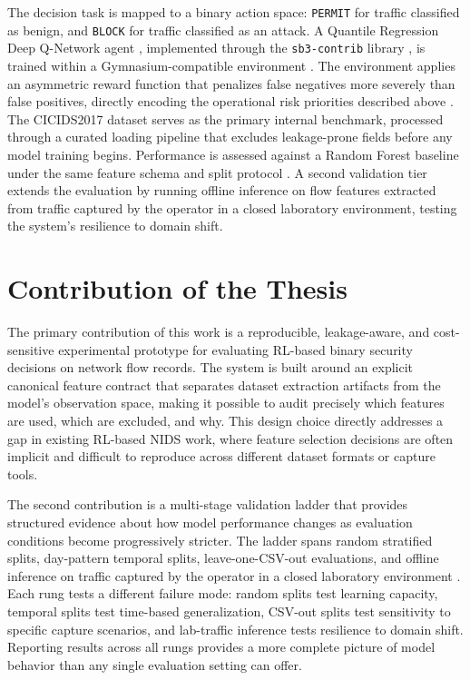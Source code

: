 The decision task is mapped to a binary action space: \texttt{PERMIT} for traffic classified as benign, and \texttt{BLOCK} for traffic classified as an attack. A Quantile Regression Deep Q-Network agent \parencite{Dabney2018QRDQN}, implemented through the \texttt{sb3-contrib} library \parencite{SB3ContribQRDQNDocs}, is trained within a Gymnasium-compatible environment \parencite{GymnasiumDocs}. The environment applies an asymmetric reward function that penalizes false negatives more severely than false positives, directly encoding the operational risk priorities described above \parencite{Cardenas2006IDSFramework}. The CICIDS2017 dataset \parencite{Sharafaldin2018CICIDS2017,CICIDS2017Web} serves as the primary internal benchmark, processed through a curated loading pipeline that excludes leakage-prone fields before any model training begins. Performance is assessed against a Random Forest baseline under the same feature schema and split protocol \parencite{Engelen2021CICIDSIssues}. A second validation tier extends the evaluation by running offline inference on flow features extracted from traffic captured by the operator in a closed laboratory environment, testing the system's resilience to domain shift.

\section{Contribution of the Thesis}
The primary contribution of this work is a reproducible, leakage-aware, and cost-sensitive experimental prototype for evaluating RL-based binary security decisions on network flow records. The system is built around an explicit canonical feature contract that separates dataset extraction artifacts from the model's observation space, making it possible to audit precisely which features are used, which are excluded, and why. This design choice directly addresses a gap in existing RL-based NIDS work, where feature selection decisions are often implicit and difficult to reproduce across different dataset formats or capture tools.

The second contribution is a multi-stage validation ladder that provides structured evidence about how model performance changes as evaluation conditions become progressively stricter. The ladder spans random stratified splits, day-pattern temporal splits, leave-one-CSV-out evaluations, and offline inference on traffic captured by the operator in a closed laboratory environment \parencite{Lanvin2023Errors}. Each rung tests a different failure mode: random splits test learning capacity, temporal splits test time-based generalization, CSV-out splits test sensitivity to specific capture scenarios, and lab-traffic inference tests resilience to domain shift. Reporting results across all rungs provides a more complete picture of model behavior than any single evaluation setting can offer.


